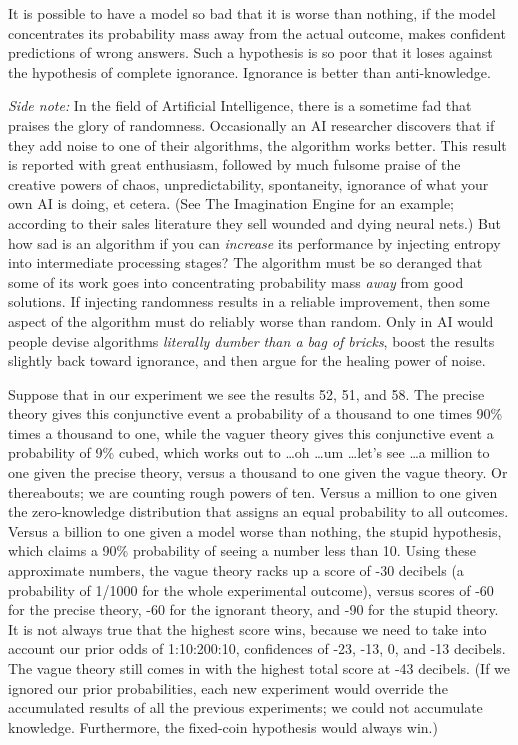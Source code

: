 {
 It is possible to have a model so bad that it is worse than
nothing, if the model concentrates its probability mass away from the
actual outcome, makes confident predictions of wrong answers. Such a
hypothesis is so poor that it loses against the hypothesis of complete
ignorance. Ignorance is better than anti-knowledge.}

{
 \textit{Side note:} In the field of Artificial Intelligence, there
is a sometime fad that praises the glory of randomness. Occasionally an
AI researcher discovers that if they add noise to one of their
algorithms, the algorithm works better. This result is reported with
great enthusiasm, followed by much fulsome praise of the creative
powers of chaos, unpredictability, spontaneity, ignorance of what your
own AI is doing, et cetera. (See The Imagination Engine for an example;
according to their sales literature they sell wounded and dying neural
nets.) But how sad is an algorithm if you can
\textit{increase} its performance by injecting entropy into
intermediate processing stages? The algorithm must be so deranged that
some of its work goes into concentrating probability mass \textit{away}
from good solutions. If injecting randomness results in a reliable
improvement, then some aspect of the algorithm must do reliably worse
than random. Only in AI would people devise algorithms
\textit{literally dumber than a bag of bricks}, boost the results
slightly back toward ignorance, and then argue for the healing power of
noise.}

{
 Suppose that in our experiment we see the results 52, 51, and 58.
The precise theory gives this conjunctive event a probability of a
thousand to one times 90\% times a thousand to one, while the vaguer
theory gives this conjunctive event a probability of 9\% cubed, which
works out to \ldots oh \ldots um \ldots let's see \ldots a
million to one given the precise theory, versus a thousand to one given
the vague theory. Or thereabouts; we are counting rough powers of ten.
Versus a million to one given the zero-knowledge distribution that
assigns an equal probability to all outcomes. Versus a billion to one
given a model worse than nothing, the stupid hypothesis, which claims a
90\% probability of seeing a number less than 10. Using these
approximate numbers, the vague theory racks up a score of -30 decibels
(a probability of 1/1000 for the whole experimental outcome), versus
scores of -60 for the precise theory, -60 for the ignorant theory, and
-90 for the stupid theory. It is not always true that the highest score
wins, because we need to take into account our prior odds of
1:10:200:10, confidences of -23, -13, 0, and -13 decibels. The vague
theory still comes in with the highest total score at -43 decibels. (If
we ignored our prior probabilities, each new experiment would override
the accumulated results of all the previous experiments; we could not
accumulate knowledge. Furthermore, the fixed-coin hypothesis would
always win.)}

